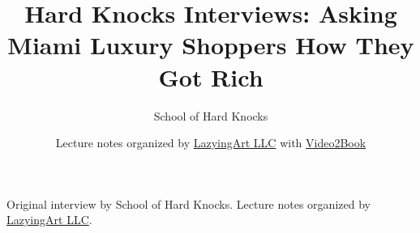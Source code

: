 \documentclass[11pt,oneside]{book}
\begin{document}
\frontmatter
\title{Hard Knocks Interviews: Asking Miami Luxury Shoppers How They Got Rich}
\author{School of Hard Knocks}
\date{Lecture notes organized by \href{https://lazying.art}{LazyingArt LLC} with \href{https://github.com/lachlanchen/Video2Book}{Video2Book}}
\maketitle
\begin{center}
\small Original interview by School of Hard Knocks. Lecture notes organized by \href{https://lazying.art}{LazyingArt LLC}.
\end{center}
\clearpage
\mainmatter

\end{document}

